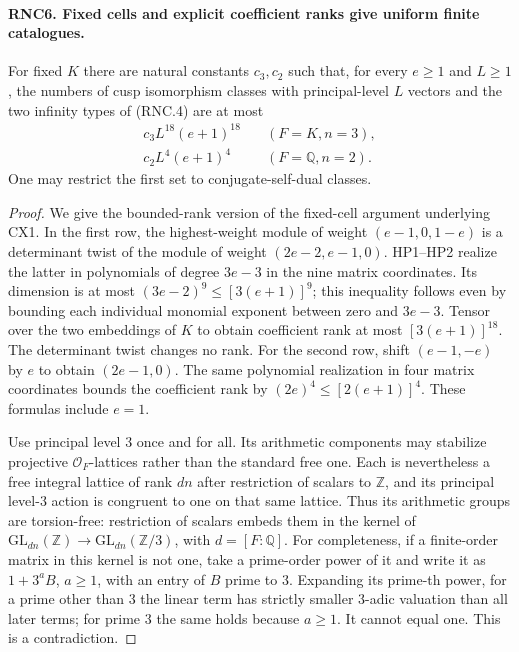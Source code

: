 \documentclass[11pt,a4paper]{article}
\numberwithin{equation}{section}
\theoremstyle{remark}\newtheorem{remark}[theorem]{Remark}
\begin{document}
\paragraph{RNC6. Fixed cells and explicit coefficient ranks give uniform finite catalogues.}
\label{claim:RNC6}
For fixed $K$ there are natural constants $c_3,c_2$ such that,
for every $e\geq1$ and $L\geq1$, the numbers of cusp
isomorphism classes with principal-level $L$ vectors and the
two infinity types of (RNC.4) are at most
\[
 \begin{split}
 c_3 L^{18}(e+1)^{18}&\quad(F=K,n=3),\\
 c_2 L^4(e+1)^4&\quad(F=\mathbb Q,n=2).
 \end{split}                                                   \tag{RNC.12}
\]
One may restrict the first set to conjugate-self-dual classes.
\begin{proof}
We give the bounded-rank version of the fixed-cell argument
underlying CX1.  In the first row, the highest-weight module
of weight $(e-1,0,1-e)$ is a determinant twist of the module
of weight $(2e-2,e-1,0)$.  HP1--HP2 realize the latter in
polynomials of degree $3e-3$ in the nine matrix coordinates.
Its dimension is at most $(3e-2)^9\leq[3(e+1)]^9$; this
inequality follows even by bounding each individual monomial
exponent between zero and $3e-3$.  Tensor over the two
embeddings of $K$ to obtain coefficient rank at most
$[3(e+1)]^{18}$.  The determinant twist changes no rank.
For the second row, shift $(e-1,-e)$ by $e$ to obtain
$(2e-1,0)$.  The same polynomial realization in four matrix
coordinates bounds the coefficient rank by
$(2e)^4\leq[2(e+1)]^4$.  These formulas include $e=1$.

Use principal level $3$ once and for all.  Its arithmetic
components may stabilize projective $\mathcal O_F$-lattices
rather than the standard free one.  Each is nevertheless
a free integral lattice of rank $dn$ after restriction of
scalars to $\mathbb Z$, and its principal level-$3$ action
is congruent to one on that same lattice.  Thus its arithmetic
groups are torsion-free: restriction of scalars embeds them
in the kernel of $\mathrm{GL}_{dn}(\mathbb Z)\to
\mathrm{GL}_{dn}(\mathbb Z/3)$, with $d=[F:\mathbb Q]$.
For completeness, if a finite-order matrix in this kernel
is not one, take a prime-order power of it and write it as
$1+3^a B$, $a\geq1$, with an entry of $B$ prime to $3$.
Expanding its prime-th power, for a prime other than $3$
the linear term has strictly smaller $3$-adic valuation
than all later terms; for prime $3$ the same holds because
$a\geq1$.  It cannot equal one.  This is a contradiction.


\end{proof}
\end{document}
